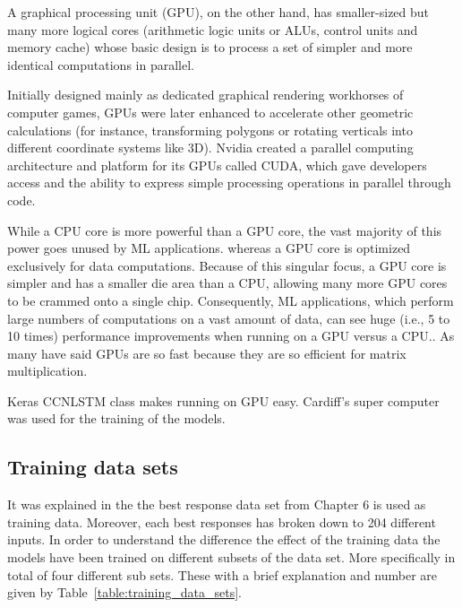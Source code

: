 A graphical processing unit (GPU), on the other hand, has smaller-sized but many
more logical cores (arithmetic logic units or ALUs, control units and memory
cache) whose basic design is to process a set of simpler and more identical
computations in parallel.

Initially designed mainly as dedicated graphical rendering workhorses of
computer games, GPUs were later enhanced to accelerate other geometric
calculations (for instance, transforming polygons or rotating verticals into
different coordinate systems like 3D). Nvidia created a parallel computing
architecture and platform for its GPUs called CUDA, which gave developers access
and the ability to express simple processing operations in parallel through
code.

While a CPU core is more powerful than a GPU core, the vast majority of this
power goes unused by ML applications. whereas a GPU core is optimized
exclusively for data computations. Because of this singular focus, a GPU core is
simpler and has a smaller die area than a CPU, allowing many more GPU cores to
be crammed onto a single chip. Consequently, ML applications, which perform
large numbers of computations on a vast amount of data, can see huge (i.e., 5 to
10 times) performance improvements when running on a GPU versus a CPU..
As many have said GPUs are so fast because they are so efficient for matrix
multiplication.

Keras CCNLSTM class makes running on GPU easy. Cardiff's super computer
was used for the training of the models.

\subsection{Training data sets}

It was explained in the the best response data set from Chapter 6 is used as
training data. Moreover, each best responses has broken down to 204 different
inputs. In order to understand the difference the effect of the training data
the models have been trained on different subsets of the data set. More
specifically in total of four different sub sets. These with a brief explanation
and number are given by Table~\ref{table:training_data_sets}.

